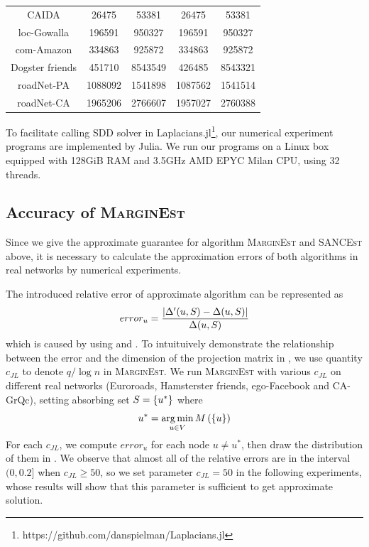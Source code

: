 \documentclass[sigconf]{acmart}
\begin{document}
\begin{table}
\begin{tabular}{ccccc}
        CAIDA               & 26475   & 53381   & 26475   & 53381   \\
        loc-Gowalla         & 196591  & 950327  & 196591  & 950327  \\
        com-Amazon          & 334863  & 925872  & 334863  & 925872  \\
        Dogster friends     & 451710  & 8543549 & 426485  & 8543321 \\
        roadNet-PA          & 1088092 & 1541898 & 1087562 & 1541514 \\
        roadNet-CA          & 1965206 & 2766607 & 1957027 & 2760388 \\
        \bottomrule
    \end{tabular}
\end{table}

To facilitate calling SDD solver in Laplacians.jl\footnote{https://github.com/danspielman/Laplacians.jl}, our numerical experiment programs are implemented by Julia.
We run our programs on a Linux box equipped with 128GiB RAM and 3.5GHz AMD EPYC Milan CPU, using 32 threads.

\subsection{Accuracy of \textsc{MarginEst}}

Since we give the approximate guarantee for algorithm \textsc{MarginEst} and \textsc{SANCEst} above, it is necessary to calculate the approximation errors of both algorithms in real networks by numerical experiments.

The introduced relative error of approximate algorithm can be represented as
\[error_u=\frac{\left|\Delta'(u,S)-\Delta(u,S) \right|}{\Delta(u,S)}\]
which is caused by using  and .
To intuituively demonstrate the relationship between the error and the dimension of the projection matrix in , we use quantity \(c_{JL}\) to denote \(q/\log n\) in \textsc{MarginEst}.
We run \textsc{MarginEst} with various \(c_{JL}\) on different real networks (Euroroads, Hamsterster friends, ego-Facebook and CA-GrQc), setting absorbing set \(S=\left\{u^* \right\}\) where
\[u^*=\operatorname*{arg\,min}_{u\in V}M\left(\left\{u \right\}\right)\]
For each \(c_{JL}\), we compute \(error_u\) for each node \(u\neq u^*\), then draw the distribution of them in .
We observe that almost all of the relative errors are in the interval \((0,0.2]\) when \(c_{JL}\ge50\), so we set parameter \(c_{JL}=50\) in the following experiments, whose results will show that this parameter is sufficient to get approximate solution.
\end{document}
